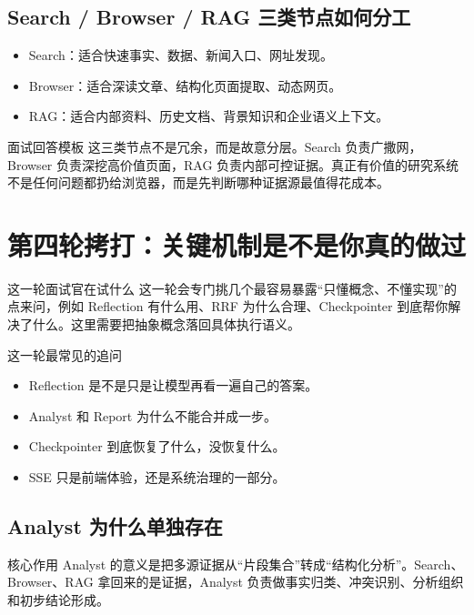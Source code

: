 \documentclass[12pt]{article}
\begin{document}
\subsection{Search / Browser / RAG 三类节点如何分工}
\begin{itemize}[leftmargin=2em]
  \item Search：适合快速事实、数据、新闻入口、网址发现。
  \item Browser：适合深读文章、结构化页面提取、动态网页。
  \item RAG：适合内部资料、历史文档、背景知识和企业语义上下文。
\end{itemize}

\begin{summaryBox}{面试回答模板}
这三类节点不是冗余，而是故意分层。Search 负责广撒网，Browser 负责深挖高价值页面，RAG 负责内部可控证据。真正有价值的研究系统不是任何问题都扔给浏览器，而是先判断哪种证据源最值得花成本。
\end{summaryBox}

\section{第四轮拷打：关键机制是不是你真的做过}

\begin{summaryBox}{这一轮面试官在试什么}
这一轮会专门挑几个最容易暴露“只懂概念、不懂实现”的点来问，例如 Reflection 有什么用、RRF 为什么合理、Checkpointer 到底帮你解决了什么。这里需要把抽象概念落回具体执行语义。
\end{summaryBox}

\begin{qaBox}{这一轮最常见的追问}
\begin{itemize}[leftmargin=2em]
  \item Reflection 是不是只是让模型再看一遍自己的答案。
  \item Analyst 和 Report 为什么不能合并成一步。
  \item Checkpointer 到底恢复了什么，没恢复什么。
  \item SSE 只是前端体验，还是系统治理的一部分。
\end{itemize}
\end{qaBox}

\subsection{Analyst 为什么单独存在}
\begin{qaBox}{核心作用}
Analyst 的意义是把多源证据从“片段集合”转成“结构化分析”。Search、Browser、RAG 拿回来的是证据，Analyst 负责做事实归类、冲突识别、分析组织和初步结论形成。
\end{qaBox}
\end{document}
